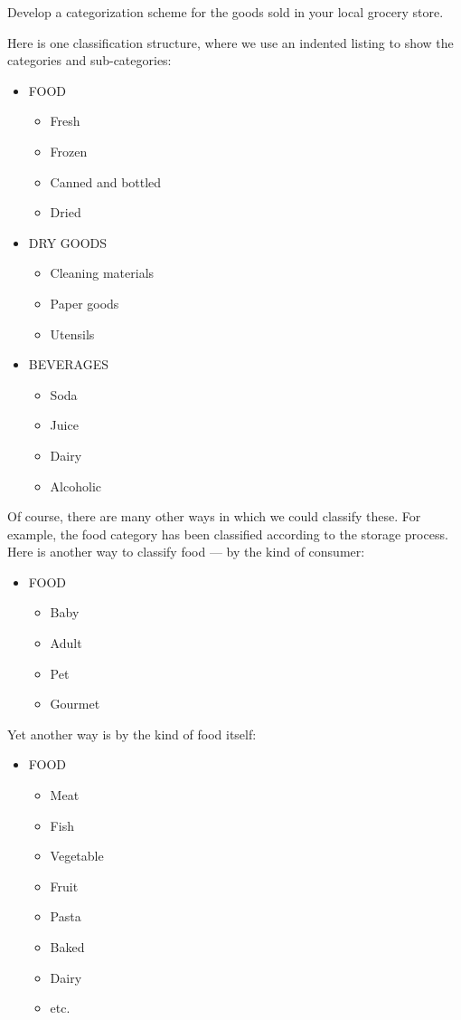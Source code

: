 \documentclass{article}
\begin{document}
\begin{itshape}
Develop a categorization scheme for the goods sold in your local
      grocery store.
\end{itshape}

    Here is one classification structure, where we use an indented listing to
show the categories and sub-categories:
\begin{itemize}
\item FOOD
  \begin{itemize}
  \item Fresh
  \item Frozen
  \item Canned and bottled
  \item Dried
  \end{itemize}
\item DRY GOODS
  \begin{itemize}
  \item Cleaning materials
  \item Paper goods
  \item Utensils
  \end{itemize}
\item BEVERAGES
  \begin{itemize}
  \item Soda
  \item Juice
  \item Dairy
  \item Alcoholic
  \end{itemize}
\end{itemize}

    Of course, there are many other ways in which we could classify these. For
example, the food category has been classified according to the storage
process. Here is another way to classify food --- by the kind of consumer:
\begin{itemize}
\item FOOD
  \begin{itemize}
  \item Baby
  \item Adult
  \item Pet
  \item Gourmet
  \end{itemize}
\end{itemize}

    Yet another way is by the kind of food itself:
\begin{itemize}
\item FOOD
  \begin{itemize}
  \item Meat
  \item Fish
  \item Vegetable
  \item Fruit
  \item Pasta
  \item Baked
  \item Dairy 
  \item etc.
  \end{itemize}
\end{itemize}
\end{document}
